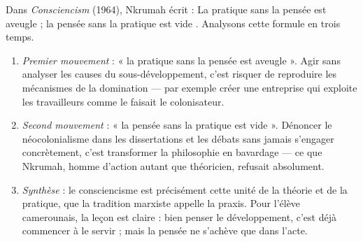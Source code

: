 \documentclass[11pt]{article}
\newcommand{\cle}[1]{{\popxbold\color{popdark}#1}}
\begin{document}
\begin{experience}
Dans \emph{Consciencism} (1964), Nkrumah écrit : \guillemotleft La pratique sans la pensée est aveugle ; la pensée sans la pratique est vide \guillemotright. Analysons cette formule en trois temps.
\begin{enumerate}
\item \emph{Premier mouvement} : « la pratique sans la pensée est aveugle ». Agir sans analyser les causes du sous-développement, c'est risquer de reproduire les mécanismes de la domination — par exemple créer une entreprise qui exploite les travailleurs comme le faisait le colonisateur.
\item \emph{Second mouvement} : « la pensée sans la pratique est vide ». Dénoncer le néocolonialisme dans les dissertations et les débats sans jamais s'engager concrètement, c'est transformer la philosophie en bavardage — ce que Nkrumah, homme d'action autant que théoricien, refusait absolument.
\item \emph{Synthèse} : le consciencisme est précisément cette unité de la théorie et de la pratique, que la tradition marxiste appelle la \cle{praxis}. Pour l'élève camerounais, la leçon est claire : bien penser le développement, c'est déjà commencer à le servir ; mais la pensée ne s'achève que dans l'acte.
\end{enumerate}
\end{experience}
\end{document}

